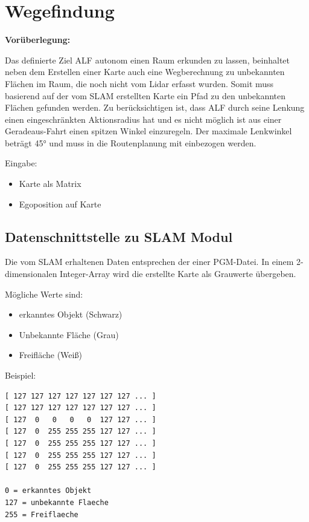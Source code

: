 \section{Wegefindung}

\textbf{Vorüberlegung:}

Das definierte Ziel ALF autonom einen Raum erkunden zu lassen, beinhaltet neben dem Erstellen einer Karte auch eine Wegberechnung zu unbekannten Flächen im Raum, die noch nicht vom Lidar erfasst wurden. Somit muss basierend auf der vom SLAM erstellten Karte ein Pfad zu den unbekannten Flächen gefunden werden.
Zu berücksichtigen ist, dass ALF durch seine Lenkung einen eingeschränkten Aktionsradius hat und es nicht möglich ist aus einer Geradeaus-Fahrt einen spitzen Winkel einzuregeln. Der maximale Lenkwinkel beträgt 45° und muss in die Routenplanung mit einbezogen werden. 

Eingabe: 
\begin{itemize}
\item Karte als Matrix
\item Egoposition auf Karte
\end{itemize}


\subsection{Datenschnittstelle zu SLAM Modul}

Die vom SLAM erhaltenen Daten entsprechen der einer PGM-Datei. In einem 2-dimensionalen Integer-Array wird die erstellte Karte als Grauwerte übergeben. 

Mögliche Werte sind:
\begin{itemize}
\item erkanntes Objekt (Schwarz)
\item Unbekannte Fläche (Grau)
\item Freifläche (Weiß)
\end{itemize}

\vspace{0.5cm}

Beispiel: 
\begin{lstlisting}
[ 127 127 127 127 127 127 127 ... ]
[ 127 127 127 127 127 127 127 ... ]
[ 127  0   0   0   0  127 127 ... ]
[ 127  0  255 255 255 127 127 ... ]
[ 127  0  255 255 255 127 127 ... ]
[ 127  0  255 255 255 127 127 ... ]
[ 127  0  255 255 255 127 127 ... ]

0 = erkanntes Objekt
127 = unbekannte Flaeche
255 = Freiflaeche
\end{lstlisting}


